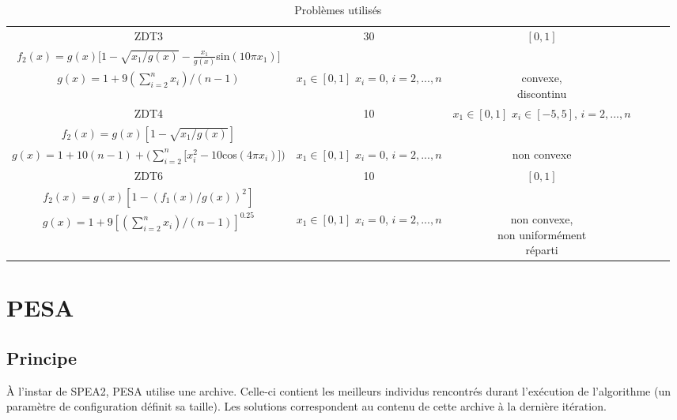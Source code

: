 \documentclass[12pt]{article}
\newcommand{\fncell}[3][]{\makecell[l]{#1 \\ #2 \\ #3}}
\begin{document}
\begin{table}[ht]
\begin{adjustbox}{width=1\textwidth}
\begin{tabular}{|c|c|c|c|c|c|}
      \hline
      ZDT3 & 30 & $[0, 1]$ & \fncell[$f_1(x) = x_1$]
                             {$f_2(x) = g(x) [1 - \sqrt{x_1 / g(x)} - \frac{x_1}{g(x)}$sin$(10\pi{}x_1)]$}
                             {$g(x) = 1 + 9(\sum_{i = 2}^{n} x_i) / (n - 1)$}
                                                                   & \makecell{$x_1 \in{} [0, 1]$ \\ $x_i = 0$, \\ $i = 2, ..., n$} & \makecell{convexe, \\ discontinu}\\
      \hline
      ZDT4 & 10 & \makecell{$x_1 \in{} [0, 1]$ \\ $x_i \in{} [-5, 5]$, \\ $i = 2, ..., n$}
               & \fncell[$f_1(x) = x_1$]
                 {$f_2(x) = g(x) [1 - \sqrt{x_1 / g(x)}]$}
                 {$g(x) = 1 + 10(n - 1) + (\sum_{i = 2}^{n} [x_i^2 - 10$cos$(4\pi{}x_i)])$}
                     & \makecell{$x_1 \in{} [0, 1]$ \\ $x_i = 0$, \\ $i = 2, ..., n$} & non convexe\\
      \hline
      ZDT6 & 10 & $[0, 1]$ & \fncell[$f_1(x) = 1 - \exp(-4x_1)$sin$^6(6\pi{}x_1)$]
                             {$f_2(x) = g(x) [1 - (f_1(x) / g(x))^2]$}
                             {$g(x) = 1 + 9[(\sum_{i = 2}^{n} x_i) / (n - 1)]^{0.25}$}
                                                                   & \makecell{$x_1 \in{} [0, 1]$ \\ $x_i = 0$, \\ $i = 2, ..., n$} & \makecell{non convexe, \\ non uniformément \\ réparti}\\
      \hline
    \end{tabular}
  \end{adjustbox}
  \caption{Problèmes utilisés} 
\end{table}

\section{PESA}

\subsection{Principe}

À l'instar de SPEA2, PESA utilise une archive. Celle-ci contient les
meilleurs individus rencontrés durant l'exécution de l'algorithme (un
paramètre de configuration définit sa taille). Les solutions
correspondent au contenu de cette archive à la dernière itération.\\
\end{document}
